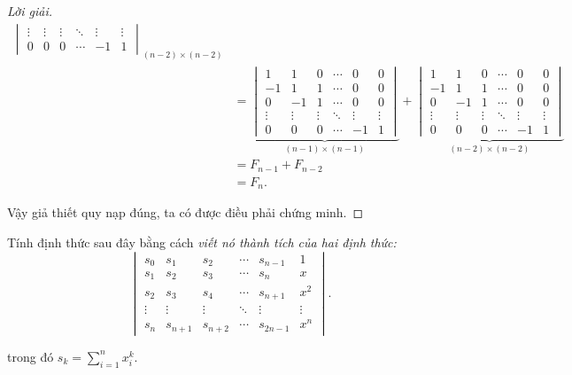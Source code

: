 \documentclass[class=linearalgebra,crop=false]{standalone}
\begin{document}
\begin{proof}[Lời giải]
\begin{align*}
{\begin{vmatrix}
                            \vdots & \vdots & \vdots & \ddots & \vdots & \vdots \\
                            0      & 0      & 0      & \cdots & -1     & 1
                        \end{vmatrix}}_{(n-2)\times (n-2)} \\
         & =
        \underbrace{\begin{vmatrix}
                            1      & 1      & 0      & \cdots & 0      & 0      \\
                            -1     & 1      & 1      & \cdots & 0      & 0      \\
                            0      & -1     & 1      & \cdots & 0      & 0      \\
                            \vdots & \vdots & \vdots & \ddots & \vdots & \vdots \\
                            0      & 0      & 0      & \cdots & -1     & 1
                        \end{vmatrix}}_{(n-1)\times (n-1)}
        +
        \underbrace{\begin{vmatrix}
                            1      & 1      & 0      & \cdots & 0      & 0      \\
                            -1     & 1      & 1      & \cdots & 0      & 0      \\
                            0      & -1     & 1      & \cdots & 0      & 0      \\
                            \vdots & \vdots & \vdots & \ddots & \vdots & \vdots \\
                            0      & 0      & 0      & \cdots & -1     & 1
                        \end{vmatrix}}_{(n-2)\times (n-2)} \\
         & = F_{n-1} + F_{n-2}                                          \\
         & = F_{n}.
    \end{align*}
    \endgroup
    \par Vậy giả thiết quy nạp đúng, ta có được điều phải chứng minh.
\end{proof}

\begin{exercise}
    \par Tính định thức sau đây bằng cách \textit{viết nó thành tích của hai định thức:}
    \[
        \begin{vmatrix}
            s_{0}  & s_{1}   & s_{2}   & \cdots & s_{n-1}  & 1      \\
            s_{1}  & s_{2}   & s_{3}   & \cdots & s_{n}    & x      \\
            s_{2}  & s_{3}   & s_{4}   & \cdots & s_{n+1}  & x^{2}  \\
            \vdots & \vdots  & \vdots  & \ddots & \vdots   & \vdots \\
            s_{n}  & s_{n+1} & s_{n+2} & \cdots & s_{2n-1} & x^{n}
        \end{vmatrix}.
    \]
    \par trong đó $s_{k} = \displaystyle\sum^{n}_{i=1}x_{i}^{k}$.
\end{exercise}
\end{document}
